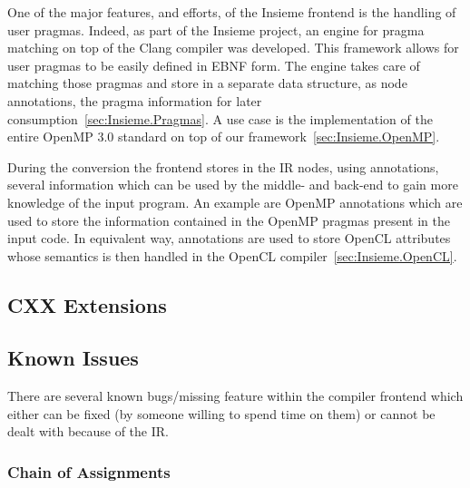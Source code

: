 One of the major features, and efforts, of the Insieme frontend is the handling
of user pragmas. Indeed, as part of the Insieme project, an engine for pragma
matching on top of the Clang compiler was developed. This framework allows for
user pragmas to be easily defined in EBNF form. The engine takes care of
matching those pragmas and store in a separate data structure, as node
annotations, the pragma information for later
consumption~\ref{sec:Insieme.Pragmas}. A use case is the implementation of the
entire OpenMP 3.0 standard on top of our framework~\ref{sec:Insieme.OpenMP}.

During the conversion the frontend stores in the IR nodes, using annotations,
several information which can be used by the middle- and back-end to gain more
knowledge of the input program. An example are OpenMP annotations which are used
to store the information contained in the OpenMP pragmas present in the input
code. In equivalent way, annotations are used to store OpenCL attributes whose
semantics is then handled in the OpenCL compiler~\ref{sec:Insieme.OpenCL}.











\subsection{CXX Extensions}
\label{sec:Insieme.Frontend.CXX}





\subsection{Known Issues}

There are several known bugs/missing feature within the compiler frontend which
either can be fixed (by someone willing to spend time on them) or cannot be dealt 
with because of the IR. 

\subsubsection{Chain of Assignments}

